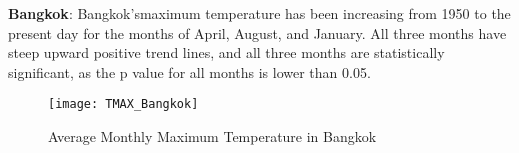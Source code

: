 \textbf{Bangkok}: Bangkok'smaximum temperature has been increasing from 1950 to the present day for the months of April, August, and January. All three months have steep upward positive trend lines, and all three months are statistically significant, as the p value for all months is lower than 0.05.

\begin{figure}[h!]
  \centering
  \texttt{[image: TMAX\_Bangkok]}
  \caption{Average Monthly Maximum Temperature in Bangkok}
  \label{fig:TMAX_bangkok}
\end{figure}











